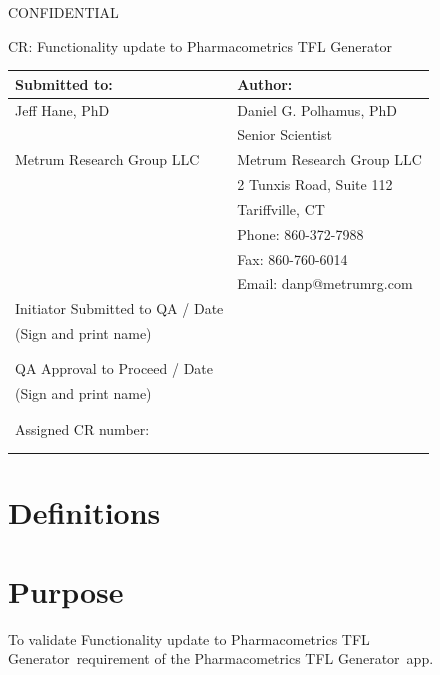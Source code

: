 \documentclass{article}
\newcommand{\tfl}{Pharmacometrics TFL Generator}
\newcommand{\topic}{Functionality update to Pharmacometrics TFL Generator}
\begin{document}
\begin{center}
{\large CONFIDENTIAL} 


\vspace*{1cm}


\vspace*{1cm}

{\huge CR: \topic}
\vspace{3.0cm}

\begin{tabular}{|l|l|}\hline
Submitted to: & Author:\\\hline
Jeff Hane, PhD & Daniel G. Polhamus, PhD \\
&Senior Scientist\\
Metrum Research Group LLC & Metrum Research Group LLC\\
 & 2 Tunxis Road, Suite 112\\
  & Tariffville, CT\\
  & Phone: 860-372-7988 \\
 & Fax: 860-760-6014 \\
  & Email: danp@metrumrg.com \\\hline

  Initiator Submitted to QA  / Date & \\
  
 (Sign and print name) & \\
  & \\
  & \\\hline
  
QA Approval to Proceed / Date & \\

 (Sign and print name) & \\
  & \\
 & \\\hline

Assigned CR number: & \\
& \\
& \\\hline

\end{tabular}

\end{center}

\newpage
\vspace{3in}
\section*{Definitions}


\section*{Purpose}
To validate \topic\ requirement of the \tfl\ app.
\end{document}
